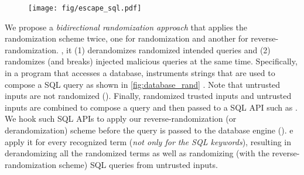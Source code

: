 {\begin{figure}[h]
    \centering
    \texttt{[image: fig/escape\_sql.pdf]}
    \vspace{-2em}
    \caption{}
    \vspace{-1em}
    \label{fig:escape_string}
\end{figure}

\noindent
{}
We propose a \emph{bidirectional randomization approach} that applies the randomization scheme twice, one for randomization and another for reverse-randomization. 
, it (1) derandomizes randomized intended queries and (2) randomizes (and breaks) injected malicious queries at the same time. 
%
Specifically, in a program that accesses a database, \sysname instruments strings that are used to compose a SQL query as shown in \autoref{fig:database_rand} .  
Note that untrusted inputs are not randomized  ().
Finally, randomized trusted inputs and untrusted inputs are combined to compose a query and then passed to a SQL API such as .
We hook such SQL APIs to apply our reverse-randomization (or derandomization) scheme before the query is passed to the database engine ().
e apply it for every recognized term (\emph{not only for the SQL keywords}), resulting in derandomizing all the randomized terms as well as randomizing (with the reverse-randomization scheme) SQL queries from untrusted inputs.
}
